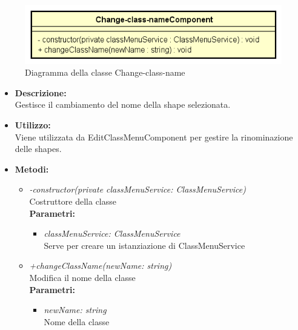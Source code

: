 \begin{figure}[h!]
	\centering
	\includegraphics[scale=0.8]{res/sections/SpecificaFrontEnd/Components/Disegnetti/change-class-name.png}
	\caption{Diagramma della classe Change-class-name}
\end{figure}

\begin{itemize}
	\item \textbf{Descrizione:}\\
	Gestisce il cambiamento del nome della shape selezionata.
	\item \textbf{Utilizzo:}\\
	Viene utilizzata da EditClassMenuComponent per gestire la rinominazione delle shapes.
	\item \textbf{Metodi:}
		\begin{itemize}
			\item \emph{-constructor(private classMenuService: ClassMenuService)}\\
    		Costruttore della classe\\
    		\textbf{Parametri:}
    		\begin{itemize}
    			\item \emph{classMenuService: ClassMenuService}\\
    			Serve per creare un istanziazione di ClassMenuService
    		\end{itemize}
    		\item \emph{+changeClassName(newName: string)}\\
    		Modifica il nome della classe\\
    		\textbf{Parametri:}
    		\begin{itemize}
    			\item \emph{newName: string}\\
    			Nome della classe
    		\end{itemize}
		\end{itemize}
\end{itemize}